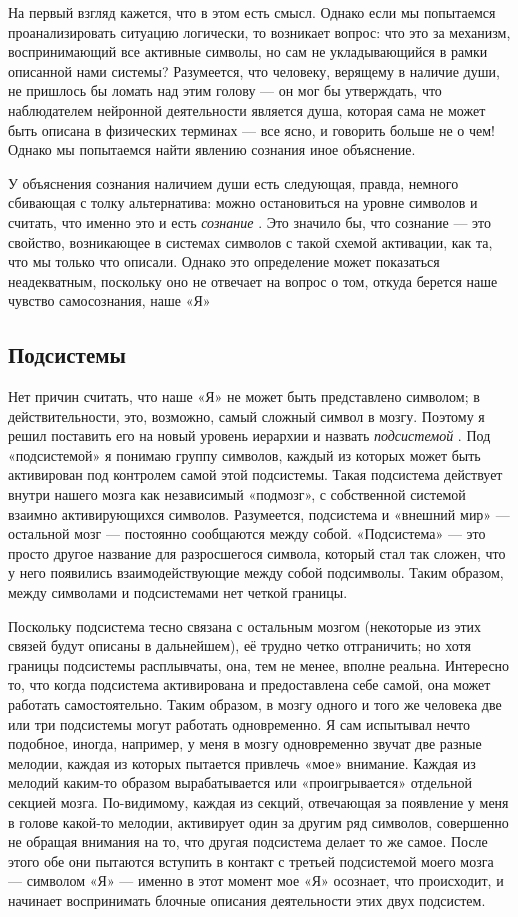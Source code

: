 \documentclass[../main.tex]{subfiles}
\begin{document}
На первый взгляд кажется, что в этом есть смысл. Однако если мы попытаемся проанализировать ситуацию логически, то возникает вопрос: что это за механизм, воспринимающий все активные символы, но сам не укладывающийся в рамки описанной нами системы? Разумеется, что человеку, верящему в наличие души, не пришлось бы ломать над этим голову --- он мог бы утверждать, что наблюдателем нейронной деятельности является душа, которая сама не может быть описана в физических терминах --- все ясно, и говорить больше не о чем! Однако мы попытаемся найти явлению сознания иное объяснение.

У объяснения сознания наличием души есть следующая, правда, немного сбивающая с толку альтернатива: можно остановиться на уровне символов и считать, что именно это и есть \emph{сознание} . Это значило бы, что сознание --- это свойство, возникающее в системах символов с такой схемой активации, как та, что мы только что описали. Однако это определение может показаться неадекватным, поскольку оно не отвечает на вопрос о том, откуда берется наше чувство самосознания, наше «Я»


\subsection{Подсистемы}

Нет причин считать, что наше «Я» не может быть представлено символом; в действительности, это, возможно, самый сложный символ в мозгу. Поэтому я решил поставить его на новый уровень иерархии и назвать \emph{подсистемой} . Под «подсистемой» я понимаю группу символов, каждый из которых может быть активирован под контролем самой этой подсистемы. Такая подсистема действует внутри нашего мозга как независимый «подмозг», с собственной системой взаимно активирующихся символов. Разумеется, подсистема и «внешний мир» --- остальной мозг --- постоянно сообщаются между собой. «Подсистема» --- это просто другое название для разросшегося символа, который стал так сложен, что у него появились взаимодействующие между собой подсимволы. Таким образом, между символами и подсистемами нет четкой границы.

Поскольку подсистема тесно связана с остальным мозгом (некоторые из этих связей будут описаны в дальнейшем), её трудно четко отграничить; но хотя границы подсистемы расплывчаты, она, тем не менее, вполне реальна. Интересно то, что когда подсистема активирована и предоставлена себе самой, она может работать самостоятельно. Таким образом, в мозгу одного и того же человека две или три подсистемы могут работать одновременно. Я сам испытывал нечто подобное, иногда, например, у меня в мозгу одновременно звучат две разные мелодии, каждая из которых пытается привлечь «мое» внимание. Каждая из мелодий каким-то образом вырабатывается или «проигрывается» отдельной секцией мозга. По-видимому, каждая из секций, отвечающая за появление у меня в голове какой-то мелодии, активирует один за другим ряд символов, совершенно не обращая внимания на то, что другая подсистема делает то же самое. После этого обе они пытаются вступить в контакт с третьей подсистемой моего мозга --- символом «Я» --- именно в этот момент мое «Я» осознает, что происходит, и начинает воспринимать блочные описания деятельности этих двух подсистем.
\end{document}
